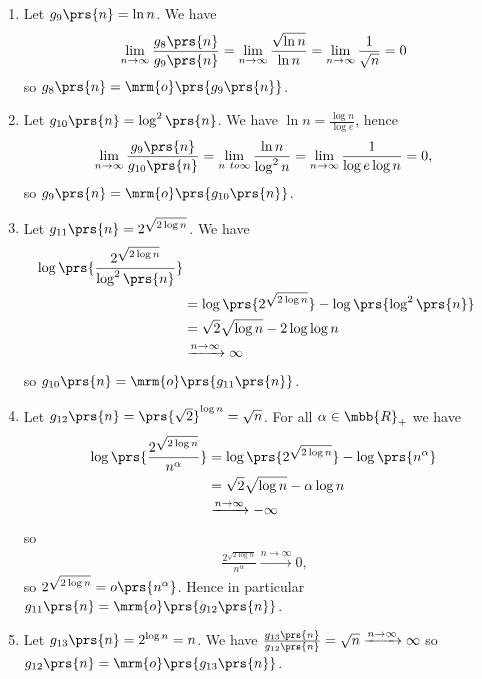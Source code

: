 \documentclass[oneside]{scrbook}
\theoremstyle{definition}
\begin{document}
\begin{problem}
\begin{enumerate}[label=\alph*.]
\begin{enumerate}[label=\arabic*.]
\item Let $g_9\prs{n} = \ln n$. We have
\begin{align*}
\lim_{n \to \infty} \frac{g_8\prs{n}}{g_9\prs{n}} = \lim_{n\to\infty} \frac{\sqrt{\ln n}}{\ln n} = \lim_{n \to \infty} \frac{1}{\sqrt{n}} = 0
\end{align*}
so $g_8\prs{n} = \mrm{o}\prs{g_9\prs{n}}$.

\item Let $g_{10}\prs{n} = \log^2\prs{n}$. We have $\ln n = \frac{\log n}{\log e}$, hence
\begin{align*}
\lim_{n \to \infty} \frac{g_9\prs{n}}{g_{10}\prs{n}} = \lim_{n\ to \infty} \frac{\ln n}{\log^2 n} = \lim_{n \to \infty} \frac{1}{\log e \log n} = 0 \text{,}
\end{align*}
so $g_9\prs{n} = \mrm{o}\prs{g_{10}\prs{n}}$.

\item Let $g_{11}\prs{n} = 2^{\sqrt{2 \log n}}$. We have
\begin{align*}
\log\prs{\frac{2^{\sqrt{2 \log n}}}{\log^2\prs{n}}}
\\&=
\log\prs{2^{\sqrt{2 \log n}}} - \log\prs{\log^2\prs{n}}
\\&=
\sqrt{2}\sqrt{\log n} - 2\log\log n
\\&\xrightarrow{n \to \infty} \infty
\end{align*}
so $g_{10}\prs{n} = \mrm{o}\prs{g_{11}\prs{n}}$.

\item Let $g_{12}\prs{n} = \prs{\sqrt{2}}^{\log n} = \sqrt{n}$. For all $\alpha \in \mbb{R}_+$ we have
\begin{align*}
\log\prs{\frac{2^{\sqrt{2 \log n}}}{n^\alpha}} &=
\log\prs{2^{\sqrt{2 \log n}}} - \log\prs{n^{\alpha}}
\\&=
\sqrt{2} \sqrt{\log n} - \alpha \log n
\\&\xrightarrow{n \to \infty} -\infty
\end{align*}
so
\begin{align*}
\frac{2^{\sqrt{2 \log n}}}{n^\alpha} \xrightarrow{n \to \infty} 0 \text{,}
\end{align*}
so $2^{\sqrt{2 \log n}} = o\prs{n^{\alpha}}$.
Hence in particular $g_{11}\prs{n} = \mrm{o}\prs{g_{12}\prs{n}}$.

\item Let $g_{13}\prs{n} = 2^{\log n} = n$. We have $\frac{g_{13}\prs{n}}{g_{12}\prs{n}} = \sqrt{n} \xrightarrow{n \to \infty} \infty$ so $g_{12}\prs{n} = \mrm{o}\prs{g_{13}\prs{n}}$.


\end{enumerate}
\end{enumerate}
\end{problem}
\end{document}
